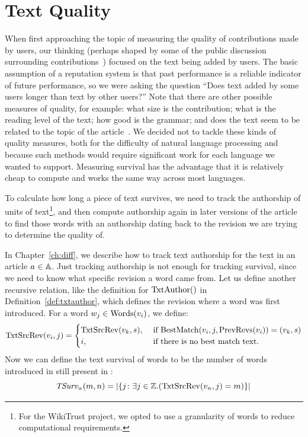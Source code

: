 \section{Text Quality}
\label{sec:textquality}

When first approaching the topic of measuring the quality
of contributions made by users, our thinking (perhaps shaped
by some of the public discussion surrounding
contributions~\cite{Swartz2006})
focused on the text being added by users.
The basic assumption of a reputation system is that past performance
is a reliable indicator of future performance, so we were
asking the question ``Does text added by some users 
longer than text by other users?''
Note that there are other possible measures of quality, for example:
what size is the contribution; what is the reading level of the
text\cite{Flesch1948,Gunning1952};
how good is the grammar; and does the text seem to be related to
the topic of the article~\cite{Itakura2009}.
We decided not to tackle these kinds of quality measures, both for
the difficulty of natural language processing and because such
methods would require significant work for each language we wanted
to support.
Measuring survival has the advantage that it is relatively cheap to
compute and works the same way across most languages.

To calculate how long a piece of text survives,
we need to track the authorship of
units of text\footnote{For the WikiTrust project, we opted to
use a granularity of words to reduce computational requirements.},
and then compute authorship again in later
versions of the article to find those words with an
authorship dating back to the revision we are trying
to determine the quality of.

In Chapter~\ref{ch:diff}, we describe how to track text authorship
for the text in an article $a_{} \in \mathbb{A}$.
Just tracking authorship is not enough for tracking survival, since
we need to know what specific revision a word came from.
Let us define another recursive relation, like the definition
for $\mathrm{TxtAuthor}()$ in Definition~\ref{def:txtauthor},
which defines the revision where a word was first introduced.
For a word $w_j \in \mathrm{Words}(v_{i})$, we define:
\begin{equation*}
\mathrm{TxtSrcRev}(v_{i}, j) =
    \begin{cases}
        \mathrm{TxtSrcRev}(v_{k}, s), & \text{ if }
        \mathrm{BestMatch}(v_{i}, j, \mathrm{PrevRevs}(v_{i})) = (v_{k}, s) \\
        i, & \text{ if there is no best match text. } \\
    \end{cases}
\end{equation*}
Now we can define the text survival of words to be the number of
words introduced in  still present in :
\begin{equation}
\tsurv{\article{}}{m,n} = \left| \left\{ j \colon
    \exists j \in \mathbb{Z} . ( \txtsrcrev{\version{n},j} = m ) \right\} \right| \\
\label{eq:tsurv}
\end{equation}

